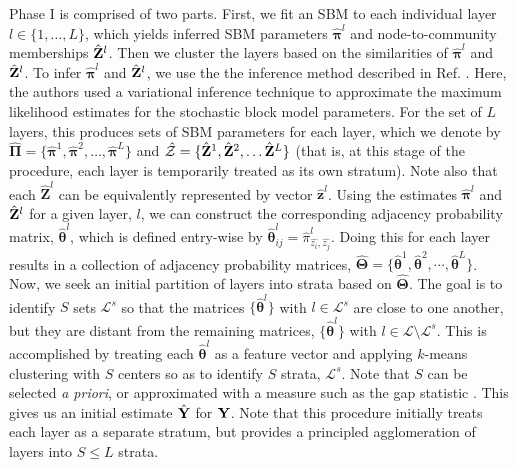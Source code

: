 Phase I is comprised of two parts. First, we fit an SBM to each individual layer $l\in\{1,\dots,L\}$, which yields inferred SBM parameters $\hat{{\boldsymbol \pi}}^l$ and node-to-community memberships $\hat{{\bf Z}}^l$.
Then we cluster the layers based on the similarities of $\hat{{\boldsymbol \pi}}^l$ and $\hat{{\bf Z}}^l$. To infer $\hat{{\boldsymbol \pi}}^l$ and $\hat{{\bf Z}}^l$, we use the the inference method described in Ref. \cite{dudin}. Here, the authors used a variational inference technique to approximate the maximum likelihood estimates for the stochastic block model parameters. For the set of $L$ layers, this produces sets of SBM parameters for each layer, which we denote by $\hat{\boldsymbol{\Pi}}=\{\hat{\boldsymbol{\pi}}^{1},\hat{\boldsymbol{\pi}}^{2}, \dots, \hat{\boldsymbol{\pi}}^{L}\}$ and $\hat{\mathcal{Z}}=\{\hat{\bf{Z}}^{1},\hat{\bf{Z}}^{2},\dots \hat{\bf{Z}}^{L}\}$ (that is, at this stage of the procedure, each layer is temporarily treated as its own stratum). Note also that each $\hat{{\boldsymbol Z}}^l$ can be equivalently represented by vector $\hat{{\boldsymbol z}}^l$. Using the estimates $\hat{{\boldsymbol \pi}}^{l}$ and $\hat{{\bf Z}}^{l}$ for a given layer, $l$, we can construct the corresponding adjacency probability matrix, $\hat{{\boldsymbol \theta}}^{l}$, which is defined entry-wise by $\hat{{\boldsymbol \theta}}_{ij}^{l}=\hat{\pi}_{\hat{z_{i}},\hat{z_{j}}}^l$. Doing this for each layer results in a collection of adjacency probability matrices, $\hat{\boldsymbol{\Theta}}=\{\hat{\boldsymbol{\theta}}^{1},\hat{\boldsymbol{\theta}}^{2}, \cdots, \hat{\boldsymbol{\theta}}^{L}\}$.\\
\indent Now, we seek an initial partition of layers into strata based on $\hat{\boldsymbol{\Theta}}$. The goal is to identify $S$ sets $\mathcal{L}^s$ so that the matrices $\{\hat{\boldsymbol{\theta}}^{l}\}$ with $l\in\mathcal{L}^s$ are close to one another, but they are distant from the remaining matrices, $\{\hat{\boldsymbol{\theta}}^{l}\}$ with $l\in\mathcal{L}\setminus \mathcal{L}^s$.
%
This is accomplished by treating each $\hat{\boldsymbol{\theta}}^{l}$ as a feature vector and applying $k$-means clustering with $S$ centers so as to identify $S$ strata, $\mathcal{L}^s$. Note that $S$ can be selected \emph{a priori}, or approximated with a measure such as the gap statistic \cite{gap}. This gives us an initial estimate $\hat{{\bf Y}}$ for ${\bf Y}$. Note that this procedure initially treats each layer as a separate stratum, but provides a principled agglomeration of layers into $S\le L$ strata.   

